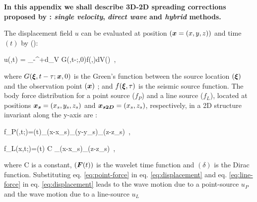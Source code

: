 \documentclass[extra,mreferee]{gji}
\newenvironment{greennote}{\par\color{OliveGreen}}{\par}
\begin{document}
\begin{greennote}

\textbf{In this appendix we shall describe 3D-2D spreading corrections proposed by \cite{Forbriger_LSS_2014}: \textit{single velocity}, \textit{direct wave} and \textit{hybrid} methods.}

The displacement field $u$ can be evaluated at position $(\mitbf{x}=(x,y,z))$ and time $(t)$ by (\cite{aki2002quantitative}):

\equation
u(,t) = \int_{-\infty}^{+\infty}d\tau \int \int \int_{V} G(\mitbf{\xi},t-\tau;,0)f(\mitbf{\xi},\tau)dV(\mitbf{\xi})\ ,
\label{eq:displacement}
\endequation

where $G(\mitbf{\xi},t-\tau;\mitbf{x},0)$ is the Green's function between the source location $(\mitbf{\xi})$ and the observation point $(\mitbf{x})$ ; and $f(\mitbf{\xi},\tau)$ is the seismic source function. The body force distribution for a point source ($f_{P}$) and a line source ($f_{L}$), located at positions $ \mitbf{x_{s}}=(x_{s}, y_{s},z_{s}) $ and $ \mitbf{x_{s2D}}=(x_{s},z_{s}) $, respectively, in a 2D structure invariant along the y-axis are :

\equation
f_{P}(,t;)=(t)\delta_{}(x-x_{s})\delta_{}(y-y_{s})\delta_{}(z-z_{s})\ , \label{eq:point-force}
\endequation

\equation
f_{L}(x,t;)=(t) C \delta_{}(x-x_{s})\delta_{}(z-z_{s})\ , 
\label{eq:line-force}
\endequation

where C is a constant, $(\mitbf{F}(t)) $ is the wavelet time function and $(\delta)$ is the Dirac function. Substituting eq. \ref{eq:point-force} in eq. \ref{eq:displacement} and eq. \ref{eq:line-force} in eq. \ref{eq:displacement} leads to the wave motion due to a point-source $u_{P}$ and the wave motion due to a line-source $u_{L}$ 


\end{greennote}
\end{document}
